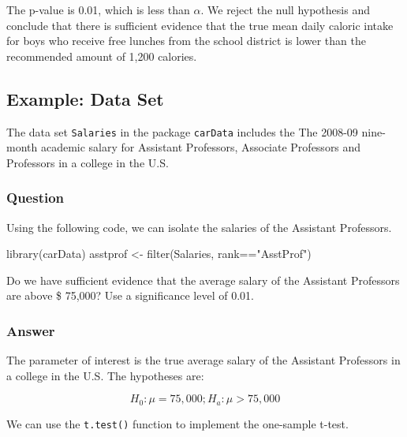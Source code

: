 \documentclass[
  letterpaper,
  DIV=11,
  numbers=noendperiod]{scrartcl}
\newenvironment{Shaded}{\begin{snugshade}}{\end{snugshade}}
\newcommand{\AttributeTok}[1]{\textcolor[rgb]{0.40,0.45,0.13}{#1}}
\newcommand{\DecValTok}[1]{\textcolor[rgb]{0.68,0.00,0.00}{#1}}
\newcommand{\FunctionTok}[1]{\textcolor[rgb]{0.28,0.35,0.67}{#1}}
\newcommand{\NormalTok}[1]{\textcolor[rgb]{0.00,0.23,0.31}{#1}}
\newcommand{\OtherTok}[1]{\textcolor[rgb]{0.00,0.23,0.31}{#1}}
\newcommand{\SpecialCharTok}[1]{\textcolor[rgb]{0.37,0.37,0.37}{#1}}
\newcommand{\StringTok}[1]{\textcolor[rgb]{0.13,0.47,0.30}{#1}}
\begin{document}
The p-value is 0.01, which is less than \(\alpha\). We reject the null
hypothesis and conclude that there is sufficient evidence that the true
mean daily caloric intake for boys who receive free lunches from the
school district is lower than the recommended amount of 1,200 calories.

\subsection{Example: Data Set}\label{example-data-set}

The data set \texttt{Salaries} in the package \texttt{carData} includes
the The 2008-09 nine-month academic salary for Assistant Professors,
Associate Professors and Professors in a college in the U.S.

\subsubsection{Question}

Using the following code, we can isolate the salaries of the Assistant
Professors.

\begin{Shaded}
\begin{Highlighting}[]
\FunctionTok{library}\NormalTok{(carData)}
\NormalTok{asstprof }\OtherTok{\textless{}{-}} \FunctionTok{filter}\NormalTok{(Salaries, rank}\SpecialCharTok{==}\StringTok{"AsstProf"}\NormalTok{)}
\end{Highlighting}
\end{Shaded}

Do we have sufficient evidence that the average salary of the Assistant
Professors are above \$ 75,000? Use a significance level of 0.01.

\subsubsection{Answer}

The parameter of interest is the true average salary of the Assistant
Professors in a college in the U.S. The hypotheses are:

\[
H_0: \mu=75,000; H_a: \mu > 75,000
\]

We can use the \texttt{t.test()} function to implement the one-sample
t-test.

\begin{Shaded}
\end{Shaded}
\end{document}
